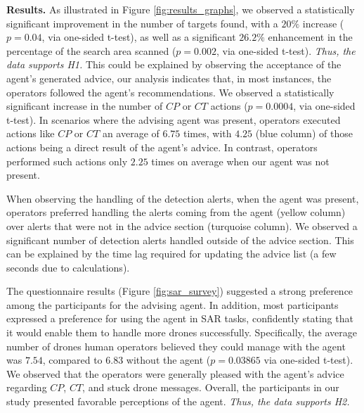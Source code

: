 \noindent\textbf{Results.}
As illustrated in Figure \ref{fig:results_graphs}, we observed a statistically significant improvement in the number of targets found, with a $20\%$ increase ($p=0.04$, via one-sided t-test), as well as a significant $26.2\%$ enhancement in the percentage of the search area scanned ($p=0.002$, via one-sided t-test). {\it Thus, the data supports H1.}
This could be explained by observing the acceptance of the agent's generated advice, our analysis indicates that, in most instances, the operators followed the agent's recommendations.
We observed a statistically significant increase in the number of $CP$ or $CT$ actions ($p=0.0004$, via one-sided t-test). In scenarios where the advising agent was present, operators executed actions like $CP$ or $CT$ an average of $6.75$ times, with $4.25$ (blue column) of those actions being a direct result of the agent's advice. In contrast, operators performed such actions only $2.25$ times on average when our agent was not present.  

When observing the handling of the detection alerts, when the agent was present, operators preferred handling the alerts coming from the agent (yellow column) over alerts that were not in the advice section (turquoise column). We observed a significant number of detection alerts handled outside of the advice section. This can be explained by the time lag required for updating the advice list (a few seconds due to calculations). 

The questionnaire results (Figure \ref{fig:sar_survey})
suggested a strong preference among the participants for the advising agent.
In addition, most participants expressed a preference for using the agent in SAR tasks, confidently stating that it would enable them to handle more drones successfully. Specifically, the average number of drones human operators believed they could manage with the agent was $7.54$, compared to $6.83$ without the agent ($p=0.03865$ via one-sided t-test). We observed that the operators were generally pleased with the agent's advice regarding $CP$, $CT$, and stuck drone messages. Overall, the participants in our study presented favorable perceptions of the agent. {\it Thus, the data supports H2.}


